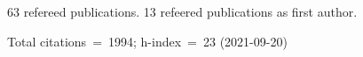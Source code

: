 63 refereed publications. 13 refeered publications as first author.

Total citations~=~1994; h-index~=~23 (2021-09-20)